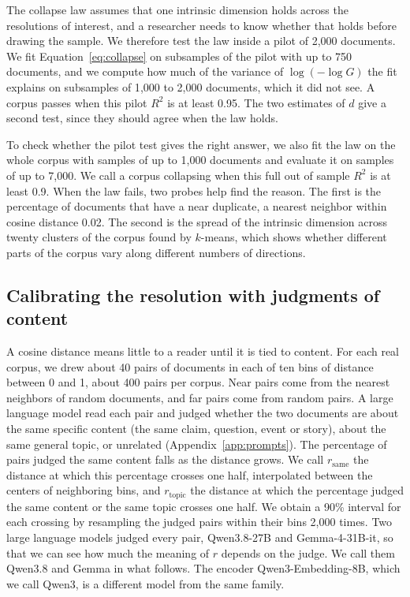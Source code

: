 The collapse law assumes that one intrinsic dimension holds across the resolutions of interest, and a researcher needs to know whether that holds before drawing the sample. We therefore test the law inside a pilot of 2{,}000 documents. We fit Equation~\ref{eq:collapse} on subsamples of the pilot with up to 750 documents, and we compute how much of the variance of $\log(-\log G)$ the fit explains on subsamples of 1{,}000 to 2{,}000 documents, which it did not see. A corpus passes when this pilot $R^2$ is at least 0.95. The two estimates of $d$ give a second test, since they should agree when the law holds.

To check whether the pilot test gives the right answer, we also fit the law on the whole corpus with samples of up to 1{,}000 documents and evaluate it on samples of up to 7{,}000. We call a corpus collapsing when this full out of sample $R^2$ is at least 0.9. When the law fails, two probes help find the reason. The first is the percentage of documents that have a near duplicate, a nearest neighbor within cosine distance 0.02. The second is the spread of the intrinsic dimension across twenty clusters of the corpus found by $k$-means, which shows whether different parts of the corpus vary along different numbers of directions.

\subsection{Calibrating the resolution with judgments of content}

A cosine distance means little to a reader until it is tied to content. For each real corpus, we drew about 40 pairs of documents in each of ten bins of distance between 0 and 1, about 400 pairs per corpus. Near pairs come from the nearest neighbors of random documents, and far pairs come from random pairs. A large language model read each pair and judged whether the two documents are about the same specific content (the same claim, question, event or story), about the same general topic, or unrelated (Appendix~\ref{app:prompts}). The percentage of pairs judged the same content falls as the distance grows. We call $r_{\mathrm{same}}$ the distance at which this percentage crosses one half, interpolated between the centers of neighboring bins, and $r_{\mathrm{topic}}$ the distance at which the percentage judged the same content or the same topic crosses one half. We obtain a 90\% interval for each crossing by resampling the judged pairs within their bins 2{,}000 times. Two large language models judged every pair, Qwen3.8-27B and Gemma-4-31B-it, so that we can see how much the meaning of $r$ depends on the judge. We call them Qwen3.8 and Gemma in what follows. The encoder Qwen3-Embedding-8B, which we call Qwen3, is a different model from the same family.

